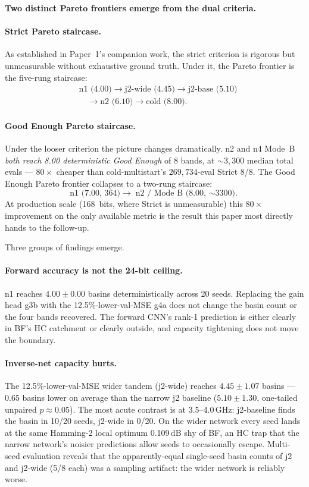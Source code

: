 \textbf{Two distinct Pareto frontiers emerge from the dual criteria.}

\paragraph{Strict Pareto staircase.} As established in Paper~1's
companion work, the strict criterion is rigorous but unmeasurable
without exhaustive ground truth. Under it, the Pareto frontier is the
five-rung staircase:
\begin{align*}
&\textrm{n1 (4.00)} \to \textrm{j2-wide (4.45)} \to \textrm{j2-base (5.10)} \\
&\quad\to \textrm{n2 (6.10)} \to \textrm{cold (8.00).}
\end{align*}

\paragraph{Good Enough Pareto staircase.} Under the looser criterion
the picture changes dramatically. n2 and n4 Mode~B \emph{both reach
8.00 deterministic Good Enough} of 8 bands, at $\sim 3{,}300$ median
total evals --- $80\times$ cheaper than cold-multistart's
$269{,}734$-eval Strict 8/8. The Good Enough Pareto frontier collapses
to a two-rung staircase:
\[
\textrm{n1 (7.00, 364)} \to \textrm{n2 / Mode~B (8.00, $\sim$3300).}
\]
At production scale (168~bits, where Strict is unmeasurable) this
$80\times$ improvement on the only available metric is the result
this paper most directly hands to the follow-up.

Three groups of findings emerge.

\paragraph{Forward accuracy is not the 24-bit ceiling.}
n1 reaches $4.00 \pm 0.00$ basins deterministically across 20 seeds.
Replacing the gain head g3b with the 12.5\%-lower-val-MSE g4a does not
change the basin count or the four bands recovered. The forward CNN's
rank-1 prediction is either clearly in BF's HC catchment or clearly
outside, and capacity tightening does not move the boundary.

\paragraph{Inverse-net capacity hurts.}
The 12.5\%-lower-val-MSE wider tandem (j2-wide) reaches
$4.45 \pm 1.07$ basins --- 0.65 basins lower on average than the
narrow j2 baseline ($5.10 \pm 1.30$, one-tailed unpaired
$p \approx 0.05$). The most acute contrast is at 3.5--4.0\,GHz:
j2-baseline finds the basin in 10/20 seeds, j2-wide in 0/20.
On the wider network every seed lands at the same Hamming-2 local
optimum 0.109\,dB shy of BF, an HC trap that the narrow network's
noisier predictions allow seeds to occasionally escape. Multi-seed
evaluation reveals that the apparently-equal single-seed basin counts
of j2 and j2-wide (5/8 each) was a sampling artifact: the wider
network is reliably worse.


